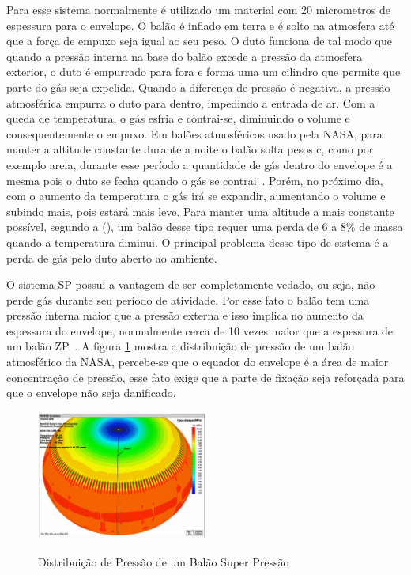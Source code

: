	Para esse sistema normalmente é utilizado um material com 20 micrometros de espessura para o envelope. O balão é inflado em terra e é solto na atmosfera até que a força de empuxo seja igual ao seu peso. O duto funciona de tal modo que quando a pressão interna na base do balão excede a pressão da atmosfera exterior, o duto é empurrado para fora e forma uma um cilindro que permite que parte do gás seja expelida. Quando a diferença de pressão é negativa, a pressão atmosférica empurra o duto para dentro, impedindo a entrada de ar. Com a queda de temperatura, o gás esfria e contrai-se, diminuindo o volume e consequentemente o empuxo. Em balões atmosféricos usado pela NASA, para manter a altitude constante durante a noite o balão solta pesos c, como por exemplo areia, durante esse período a quantidade de gás dentro do envelope é a mesma pois o duto se fecha quando o gás se contrai~\cite{eoss}. Porém, no próximo dia, com o aumento da temperatura o gás irá se expandir, aumentando o volume e subindo mais, pois estará mais leve. Para manter uma altitude a mais constante possível, segundo a  (\citeyear{nasa3}), um balão desse tipo requer uma perda de 6 a 8\% de massa quando a temperatura diminui. O principal problema desse tipo de sistema é a perda de gás pelo duto aberto ao ambiente.

	O sistema SP possui a vantagem de ser completamente vedado, ou seja, não perde gás durante seu período de atividade. Por esse fato o balão tem uma pressão interna maior que a pressão externa e isso implica no aumento da espessura do envelope, normalmente cerca de 10 vezes maior que a espessura de um balão ZP~\cite{yajima}. A figura \ref{img:distribuicaoPressao} mostra a distribuição de pressão de um balão atmosférico da NASA, percebe-se que o equador do envelope é a área de maior concentração de pressão, esse fato exige que a parte de fixação seja reforçada para que o envelope não seja danificado.

	\begin{figure}[htp]
		\centering
		\caption[Distribuição de Pressão de um Balão Super Pressão]{Distribuição de Pressão de um Balão Super Pressão~\cite{nasa2}}
		\includegraphics[width=0.5\textwidth]{figuras/distribuicaoPressao}
		\label{img:distribuicaoPressao}
	\end{figure}

